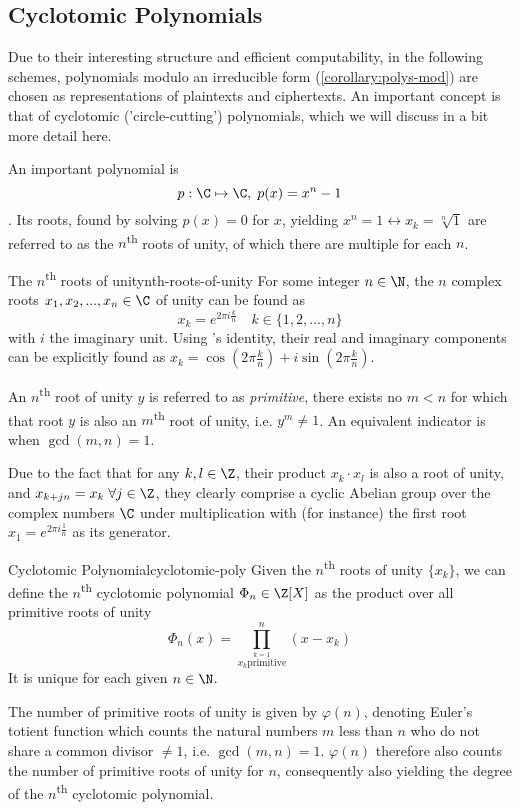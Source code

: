 \subsection{Cyclotomic Polynomials}
Due to their interesting structure and efficient computability, in the following schemes,
polynomials modulo an irreducible form (\autoref{corollary:polys-mod}) are
chosen as representations of plaintexts and ciphertexts.
An important concept is that of cyclotomic ('circle-cutting') polynomials, which we will discuss
in a bit more detail here.

An important polynomial is $$p: \C \mapsto \C, \; p(x) = x^n - 1$$.
Its roots, found by solving $p(x) = 0$ for $x$, yielding $x^n = 1 \leftrightarrow x_k = \sqrt[n]{1}$
are referred to as the $n$\textsuperscript{th} roots of unity, of which there are multiple for each $n$.

\begin{lemma}{The $n$\textsuperscript{th} roots of unity}{nth-roots-of-unity}
  For some integer $n \in \N$, the $n$ complex roots $x_1, x_2, ..., x_n \in \C$ of unity
  can be found as $$x_k = e^{2\pi i \frac{k}{n}} \quad k \in \{1, 2, ..., n\}$$
  with $i$ the imaginary unit.
  Using 's identity, their real and imaginary components can be explicitly found as
  $x_k = \cos(2\pi \frac{k}{n}) + i \sin(2\pi \frac{k}{n})$.

  An $n$\textsuperscript{th} root of unity $y$ is referred to as \textit{primitive}, 
  there exists no $m < n$ for which that root $y$ is also an $m$\textsuperscript{th} root of unity, i.e. $y^m \neq 1$.
  An equivalent indicator is when $\gcd(m, n) = 1$.
\end{lemma}
Due to the fact that for any $k, l \in \Z$, their product $x_k \cdot x_l$ is also a root of unity, and
$x_{k+jn} = x_k \; \forall j \in \Z$, they clearly comprise a cyclic Abelian group over the complex numbers
$\C$ under multiplication with (for instance) the first root $x_1 = e^{2\pi i \frac{1}{n}}$ as its generator.

\begin{definition}{Cyclotomic Polynomial}{cyclotomic-poly}
  Given the $n$\textsuperscript{th} roots of unity $\{x_k\}$, we can define the $n$\textsuperscript{th}
  cyclotomic polynomial $\Phi_n \in \Z[X]$ as the product over all primitive roots of unity
  $$\Phi_n(x) = \prod_{\stackrel{k=1}{x_k \mathrm{primitive}}}^{n} (x - x_k)$$
  It is unique for each given $n \in \N$.
\end{definition}
The number of primitive roots of unity is given by $\varphi(n)$, denoting Euler's totient function which counts the
natural numbers $m$ less than $n$ who do not share a common divisor $\neq 1$, i.e. $\gcd(m, n) = 1$.
$\varphi(n)$ therefore also counts the number of primitive roots of unity for $n$,
consequently also yielding the degree of the $n$\textsuperscript{th} cyclotomic polynomial.

